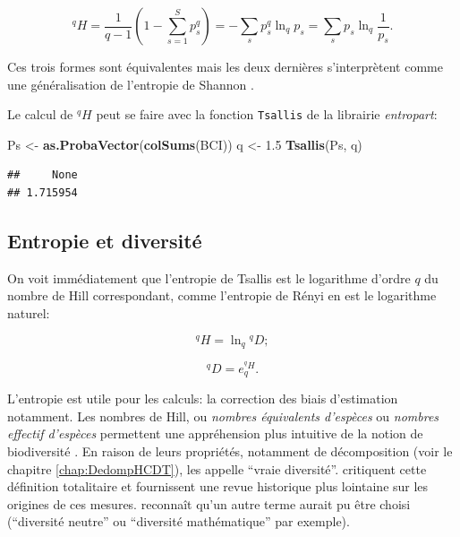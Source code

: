 \documentclass[
  11pt,
  french,
  a4paper,
  extrafontsizes,onecolumn,openright
  ]{memoir}
\newenvironment{Shaded}{\begin{snugshade}}{\end{snugshade}}
\newcommand{\FloatTok}[1]{\textcolor[rgb]{0.00,0.00,0.81}{#1}}
\newcommand{\KeywordTok}[1]{\textcolor[rgb]{0.13,0.29,0.53}{\textbf{#1}}}
\newcommand{\NormalTok}[1]{#1}
\newcommand{\StringTok}[1]{\textcolor[rgb]{0.31,0.60,0.02}{#1}}
\begin{document}
\begin{equation}
  \label{eq:EntropieHCDT}
  ^{q}\!H = \frac{1}{q-1}\left(1-\sum^S_{s=1}{p^q_s}\right)=-\sum_s{p^q_s}\ln_q{p_s}=\sum_s{p_s}\ln_q\frac{1}{p_s}.
\end{equation}

Ces trois formes sont équivalentes mais les deux dernières s'interprètent comme une généralisation de l'entropie de Shannon \autocite{Marcon2014a}.

Le calcul de \(^{q}\!H\) peut se faire avec la fonction \texttt{Tsallis} de la librairie \emph{entropart}:

\scriptsize

\begin{Shaded}
\begin{Highlighting}[]
\NormalTok{Ps <-}\StringTok{ }\KeywordTok{as.ProbaVector}\NormalTok{(}\KeywordTok{colSums}\NormalTok{(BCI))}
\NormalTok{q <-}\StringTok{ }\FloatTok{1.5}
\KeywordTok{Tsallis}\NormalTok{(Ps, q)}
\end{Highlighting}
\end{Shaded}

\begin{verbatim}
##     None 
## 1.715954
\end{verbatim}

\normalsize

\hypertarget{entropie-et-diversituxe9}{%
\subsection{Entropie et diversité}\label{entropie-et-diversituxe9}}

On voit immédiatement que l'entropie de Tsallis est le logarithme d'ordre \(q\) du nombre de Hill correspondant, comme l'entropie de Rényi en est le logarithme naturel:

\begin{equation}
  \label{eq:HlnD}
  ^{q}\!H = \ln_q{^{q}\!D};
\end{equation}

\begin{equation}
  \label{eq:DexpH}
  ^{q}\!D = e_q^{^{q}\!H}.
\end{equation}

L'entropie est utile pour les calculs: la correction des biais d'estimation notamment.
Les nombres de Hill, ou \emph{nombres équivalents d'espèces} ou \emph{nombres effectif d'espèces} permettent une appréhension plus intuitive de la notion de biodiversité \autocite{Jost2006}.
En raison de leurs propriétés, notamment de décomposition (voir le chapitre \ref{chap:DedompHCDT}), \textcite{Jost2007} les appelle \enquote{vraie diversité}.
\textcite{Hoffmann2008} critiquent cette définition totalitaire et fournissent une revue historique plus lointaine sur les origines de ces mesures.
\textcite{Jost2009} reconnaît qu'un autre terme aurait pu être choisi (\enquote{diversité neutre} ou \enquote{diversité mathématique} par exemple).
\end{document}
